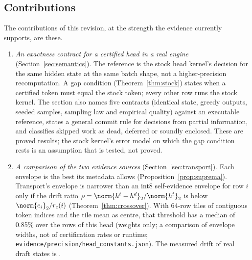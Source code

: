 \subsection{Contributions}\label{sec:contributions}
The contributions of this revision, at the strength the evidence currently supports, are these.
\begin{enumerate}
\item \emph{An exactness contract for a certified head in a real engine} (Section~\ref{sec:semantics}). The reference is the stock head kernel's decision for the same hidden state at the same batch shape, not a higher-precision recomputation. A gap condition (Theorem~\ref{thm:stock}) states when a certified token must equal the stock token; every other row runs the stock kernel. The section also names five contracts (identical state, greedy outputs, seeded samples, sampling law and empirical quality) against an executable reference, states a general commit rule for decisions from partial information, and classifies skipped work as dead, deferred or soundly enclosed. These are proved results; the stock kernel's error model on which the gap condition rests is an assumption that is tested, not proved.
\item \emph{A comparison of the two evidence sources} (Section~\ref{sec:transport}). Each envelope is the best its metadata allows (Proposition~\ref{prop:suprema}). Transport's envelope is narrower than an int8 self-evidence envelope for row $i$ only if the drift ratio $\rho=\norm{h^t-h^d}_2/\norm{h^t}_2$ is below $\norm{e_i}_2/r_c(i)$ (Theorem~\ref{thm:crossover}). With 64-row tiles of contiguous token indices and the tile mean as centre, that threshold has a median of 0.85\% over the rows of this head (weights only; a comparison of envelope widths, not of certification rates or runtime; \nolinkurl{evidence/precision/head_constants.json}). The measured drift of real draft states is .

\end{enumerate}
